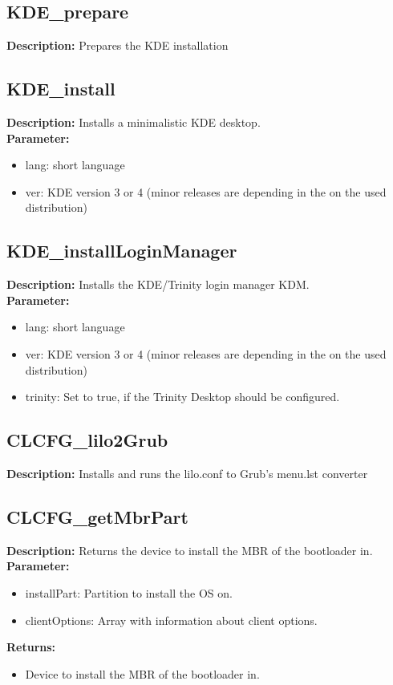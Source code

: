 \subsection{KDE\_prepare}
\textbf{Description:} Prepares the KDE installation\\

\subsection{KDE\_install}
\textbf{Description:} Installs a minimalistic KDE desktop.\\
\textbf{Parameter:}
\begin{itemize}
\item lang: short language
\item ver: KDE version 3 or 4 (minor releases are depending in the on the used distribution)
\end{itemize}

\subsection{KDE\_installLoginManager}
\textbf{Description:} Installs the KDE/Trinity login manager KDM.\\
\textbf{Parameter:}
\begin{itemize}
\item lang: short language
\item ver: KDE version 3 or 4 (minor releases are depending in the on the used distribution)
\item trinity: Set to true, if the Trinity Desktop should be configured.
\end{itemize}

\subsection{CLCFG\_lilo2Grub}
\textbf{Description:} Installs and runs the lilo.conf to Grub's menu.lst converter\\

\subsection{CLCFG\_getMbrPart}
\textbf{Description:} Returns the device to install the MBR of the bootloader in.\\
\textbf{Parameter:}
\begin{itemize}
\item installPart: Partition to install the OS on.
\item clientOptions: Array with information about client options.
\end{itemize}
\textbf{Returns:}
\begin{itemize}
\item Device to install the MBR of the bootloader in.
\end{itemize}


